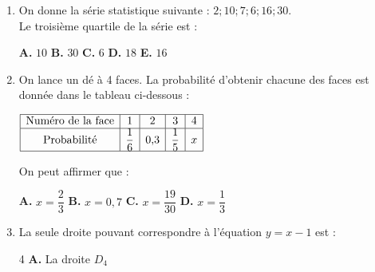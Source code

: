 \documentclass[a4paper,11pt]{article}
\begin{document}
\begin{seanceD}{} %

\begin{enumerate}
\item On donne la série statistique suivante :
      $2  ;  10  ;  7  ;  6  ;  16  ;  30$.\\
      Le troisième quartile de la série est :

\medskip
\begin{center}
\textbf{\textcolor{Couleur1}{A.}} $10$ \qquad \textbf{\textcolor{Couleur1}{B.}} $30$ \qquad \textbf{\textcolor{Couleur1}{C.}} $6$ \qquad \textbf{\textcolor{Couleur1}{D.}} $18$ \qquad \textbf{\textcolor{Couleur1}{E.}} $16$
\end{center}


\item On lance un dé à 4 faces. La probabilité d'obtenir chacune des faces est donnée dans le tableau ci-dessous :

\medskip
\begin{center}
$\renewcommand{\arraystretch}{1}
\begin{array}{|c|c|c|c|c|}
\hline
\text{Numéro de la face} & 1 & 2 & 3 & 4\\
\hline
\text{Probabilité} & \dfrac{1}{6} & 0{,}3 & \dfrac{1}{5} & x\\
\hline
 \end{array}
\renewcommand{\arraystretch}{1}$

\end{center}

\medskip
On peut affirmer que :

\medskip
\begin{center}
\textbf{\textcolor{Couleur1}{A.}} $x=\dfrac{2}{3}$ \qquad \textbf{\textcolor{Couleur1}{B.}} $x=0{,}7$ \qquad \textbf{\textcolor{Couleur1}{C.}} $x=\dfrac{19}{30}$ \qquad \textbf{\textcolor{Couleur1}{D.}} $x=\dfrac{1}{3}$
\end{center}


\item La seule droite pouvant correspondre à l'équation $y=x-1$ est  :\\
\medskip
\begin{multicols}{4}
\textbf{\textcolor{Couleur1}{A.}} La droite $D_4$ \\
\begin{tikzpicture}[baseline,scale = 0.5]


\end{tikzpicture}
\end{multicols}
\end{enumerate}
\end{seanceD}
\end{document}
